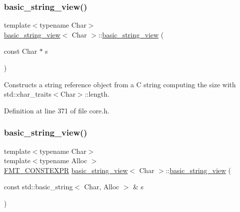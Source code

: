 \mbox{\label{classbasic__string__view_a84823e4cf3eadc6bbe4ecd18e7685ffd}} 
\subsubsection{\texorpdfstring{basic\+\_\+string\+\_\+view()}{basic\_string\_view()}\hspace{0.1cm}{\footnotesize\ttfamily [3/4]}}
{\footnotesize\ttfamily template$<$typename Char$>$ \\
\hyperlink{classbasic__string__view}{basic\+\_\+string\+\_\+view}$<$ Char $>$\+::\hyperlink{classbasic__string__view}{basic\+\_\+string\+\_\+view} (\begin{DoxyParamCaption}\item[{const Char $\ast$}]{s }\end{DoxyParamCaption})\hspace{0.3cm}{\ttfamily [inline]}}

Constructs a string reference object from a C string computing the size with {\ttfamily std\+::char\+\_\+traits$<$Char$>$\+::length}.  

Definition at line 371 of file core.\+h.

\mbox{\label{classbasic__string__view_a26380481d5c1675f0f56333f764c496b}} 
\subsubsection{\texorpdfstring{basic\+\_\+string\+\_\+view()}{basic\_string\_view()}\hspace{0.1cm}{\footnotesize\ttfamily [4/4]}}
{\footnotesize\ttfamily template$<$typename Char$>$ \\
template$<$typename Alloc $>$ \\
\hyperlink{core_8h_a69201cb276383873487bf68b4ef8b4cd}{F\+M\+T\+\_\+\+C\+O\+N\+S\+T\+E\+X\+PR} \hyperlink{classbasic__string__view}{basic\+\_\+string\+\_\+view}$<$ Char $>$\+::\hyperlink{classbasic__string__view}{basic\+\_\+string\+\_\+view} (\begin{DoxyParamCaption}\item[{const std\+::basic\+\_\+string$<$ Char, Alloc $>$ \&}]{s }\end{DoxyParamCaption})\hspace{0.3cm}{\ttfamily [inline]}}

